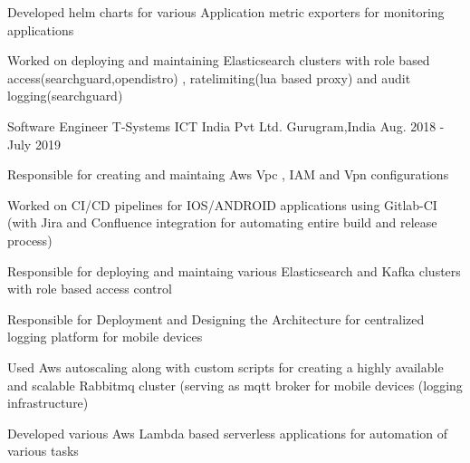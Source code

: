 \begin{cventries}
{\begin{cvitems}
               \item { Developed helm charts for various Application metric exporters for monitoring applications  }
               \item { Worked on deploying and maintaining Elasticsearch clusters with role based access(searchguard,opendistro) , ratelimiting(lua based proxy) and audit logging(searchguard)} 		
	  \end{cvitems}
    }
    \cventry
    {Software Engineer} %
    {T-Systems ICT India Pvt Ltd.} %
    {Gurugram,India} %
    {Aug. 2018 - July 2019} %
    {
      \begin{cvitems} %
	    \item { Responsible for creating and maintaing Aws Vpc , IAM and Vpn configurations}
		\item {Worked on CI/CD pipelines for IOS/ANDROID applications using Gitlab-CI (with Jira and Confluence integration for automating entire build and release process)}
		\item {Responsible for deploying and maintaing various Elasticsearch and Kafka clusters with role based access control }
		\item  { Responsible for Deployment and Designing the  Architecture for centralized logging platform for mobile devices}
		\item { Used Aws autoscaling along with custom scripts  for creating  a highly available and scalable   Rabbitmq cluster (serving as mqtt broker for mobile devices (logging infrastructure) }
		\item {Developed various  Aws Lambda based serverless applications for automation of various tasks }                   
	  \end{cvitems}
    }


\end{cventries}
